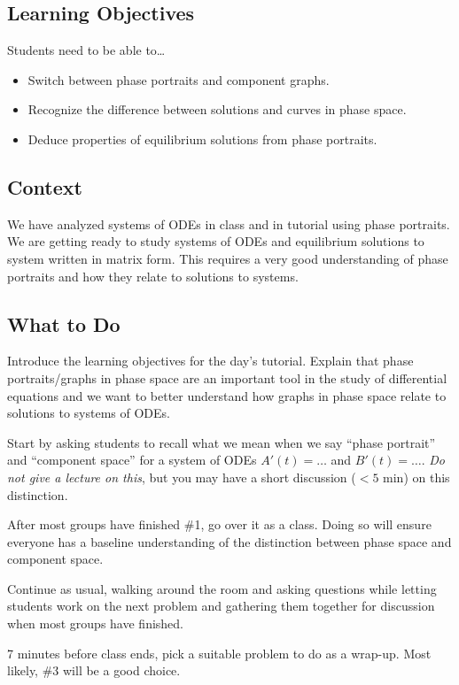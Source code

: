 \subsection*{Learning Objectives}
	Students need to be able to\ldots
	\begin{itemize}
		\item Switch between phase portraits and component graphs.
		\item Recognize the difference between solutions and curves in phase space.
		\item Deduce properties of equilibrium solutions from phase portraits.
	\end{itemize}

\subsection*{Context}
	We have analyzed systems of ODEs in class and in tutorial using phase portraits. We are getting ready to
	study systems of ODEs and equilibrium solutions to system written in matrix form. This requires a very good
	understanding of phase portraits and how they relate to solutions to systems.

\subsection*{What to Do}
	Introduce the learning objectives for the day's tutorial. Explain that phase portraits/graphs in phase space are an important
	tool in the study of differential equations and we want to better understand how graphs in phase space
	relate to solutions to systems of ODEs.

	Start by asking students to recall what we mean when we say ``phase portrait'' and ``component space'' for a system of ODEs
	$A'(t)=\ldots$ and $B'(t)=\ldots$. \emph{Do not give a lecture on this}, but you may have a short discussion ($< 5$ min)
	on this distinction.
	
	After most groups have finished \#1, go over it as a class. Doing so will ensure everyone has a baseline understanding
	of the distinction between phase space and component space.

	Continue as usual, walking around the room and asking
		questions while letting students work on the next problem and gathering them together
		for discussion when most groups have finished.

		7 minutes before class ends, pick a suitable problem to do as a wrap-up. Most likely, \#3 will be a good choice.



